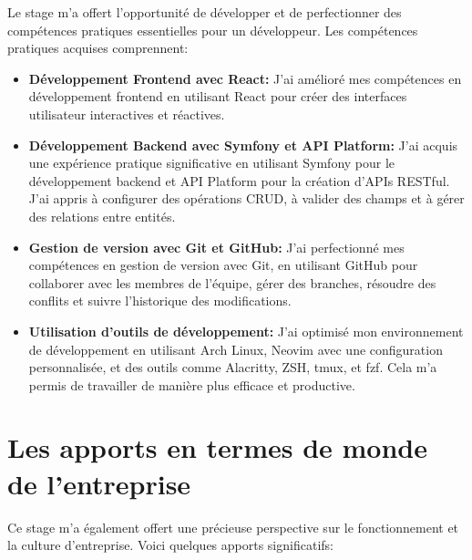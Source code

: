 \hspace{16pt}Le stage m’a offert l’opportunité de développer et de perfectionner des compétences pratiques essentielles pour un développeur. Les compétences pratiques acquises comprennent:

\begin{itemize}
  \item \textbf{Développement Frontend avec React: } J’ai amélioré mes compétences en développement frontend en utilisant React pour créer des interfaces utilisateur interactives et réactives.
  \item \textbf{Développement Backend avec Symfony et API Platform: }J’ai acquis une expérience pratique significative en utilisant Symfony pour le développement backend et API Platform pour la création d’APIs RESTful. J’ai appris à configurer des opérations CRUD, à valider des champs et à gérer des relations entre entités.
  \item \textbf{Gestion de version avec Git et GitHub: }J’ai perfectionné mes compétences en gestion de version avec Git, en utilisant GitHub pour collaborer avec les membres de l’équipe, gérer des branches, résoudre des conflits et suivre l’historique des modifications.
  \item \textbf{Utilisation d’outils de développement: }J’ai optimisé mon environnement de développement en utilisant Arch Linux, Neovim avec une configuration personnalisée, et des outils comme Alacritty, ZSH, tmux, et fzf. Cela m’a permis de travailler de manière plus efficace et productive.
\end{itemize}

\section{Les apports en termes de monde de l'entreprise}

\hspace{16pt}Ce stage m’a également offert une précieuse perspective sur le fonctionnement et la culture d’entreprise. Voici quelques apports significatifs:


